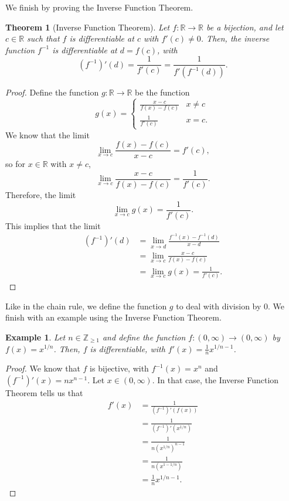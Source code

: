 \documentclass[a4paper, openany]{memoir}
\theoremstyle{definition}
\theoremstyle{plain}
\newtheorem{theorem}[definition]{Theorem}
\newtheorem{example}[definition]{Example}
\begin{document}
We finish by proving the Inverse Function Theorem.
\begin{theorem}[Inverse Function Theorem]
Let $f: \mathbb{R} \to \mathbb{R}$ be a bijection, and let $c \in \mathbb{R}$ such that $f$ is differentiable at $c$ with $f'(c) \neq 0$. Then, the inverse function $f^{-1}$ is differentiable at $d = f(c)$, with
\[(f^{-1})'(d) = \frac{1}{f'(c)} = \frac{1}{f'(f^{-1}(d))}.\]
\end{theorem}
\begin{proof}
Define the function $g: \mathbb{R} \to \mathbb{R}$ be the function
\[g(x) = \begin{cases}
\frac{x - c}{f(x) - f(c)} & x \neq c \\
\frac{1}{f'(c)} & x = c.
\end{cases}\]
We know that the limit
\[\lim_{x \to c} \frac{f(x) - f(c)}{x - c} = f'(c),\]
so for $x \in \mathbb{R}$ with $x \neq c$,
\[\lim_{x \to c} \frac{x - c}{f(x) - f(c)} = \frac{1}{f'(c)}.\]
Therefore, the limit
\[\lim_{x \to c} g(x) = \frac{1}{f'(c)}.\]
This implies that the limit
\begin{align*}
    (f^{-1})'(d) &= \lim_{x \to d} \frac{f^{-1}(x) - f^{-1}(d)}{x - d} \\
    &= \lim_{x \to c} \frac{x - c}{f(x) - f(c)} \\
    &= \lim_{x \to c} g(x) = \frac{1}{f'(c)}.
\end{align*}
\end{proof}
\noindent Like in the chain rule, we define the function $g$ to deal with division by 0. We finish with an example using the Inverse Function Theorem.
\begin{example}
Let $n \in \mathbb{Z}_{\geqslant 1}$ and define the function $f: (0, \infty) \to (0, \infty)$ by $f(x) = x^{1/n}$. Then, $f$ is differentiable, with $f'(x) = \frac{1}{n} x^{1/n-1}$.
\end{example}
\begin{proof}
We know that $f$ is bijective, with $f^{-1}(x) = x^n$ and $(f^{-1})'(x) = nx^{n-1}$. Let $x \in (0, \infty)$. In that case, the Inverse Function Theorem tells us that
\begin{align*}
    f'(x) &= \frac{1}{(f^{-1})'(f(x))} \\
    &= \frac{1}{(f^{-1})'(x^{1/n})} \\
    &= \frac{1}{n (x^{1/n})^{n-1}} \\
    &= \frac{1}{n (x^{1-1/n})} \\
    &= \frac{1}{n} x^{1/n-1}.
\end{align*}
\end{proof}
\end{document}

